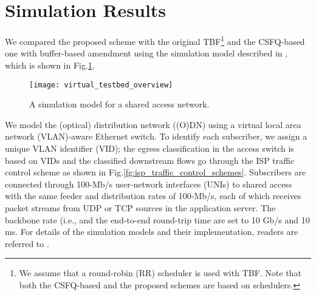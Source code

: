 \documentclass[conference,twoside,final]{IEEEtran}
\begin{document}
\section{Simulation Results}
\label{sec-3}
We compared the proposed scheme with the original TBF\footnote{We assume that a round-robin (RR) scheduler is used with TBF. Note that
both the CSFQ-based and the proposed schemes are based on schedulers.} and the CSFQ-based
one with buffer-based amendment using the simulation model described in
\cite{Kim:14-1}, which is shown in Fig.\ref{fg:simulation_model}.
\begin{figure}[!t]
\begin{center}
  \texttt{[image: virtual\_testbed\_overview]}
\end{center}
\caption{A simulation model for a shared access network.}
\label{fg:simulation_model}
\end{figure}
We model the (optical) distribution network ((O)DN) using a virtual local area
network (VLAN)-aware Ethernet switch. To identify each subscriber, we assign a
unique VLAN identifier (VID); the egress classification in the access switch is
based on VIDs and the classified downstream flows go through the ISP traffic
control scheme as shown in Fig.\ref{fg:isp_traffic_control_schemes}.
Subscribers are connected through 100-Mb/s user-network interfaces (UNIs) to
shared access with the same feeder and distribution rates of 100-Mb/s, each of
which receives packet streams from UDP or TCP sources in the application
server. The backbone rate (i.e.,  and the end-to-end round-trip time
are set to 10 Gb/s and 10 ms. For details of the simulation models and their
implementation, readers are referred to \cite{Kim:14-2}.
\end{document}

